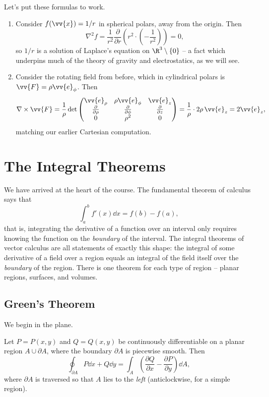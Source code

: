 \begin{example}
	Let's put these formulas to work.
	\begin{enumerate}[label=(\roman*)]
		\item Consider $f(\vv{x}) = 1/r$ in spherical polars, away from the origin. Then
		$$
		\nabla^2 f = \frac{1}{r^2}\frac{\partial}{\partial r}\left(r^2 \cdot \left(-\frac{1}{r^2}\right)\right) = 0,
		$$
		so $1/r$ is a solution of Laplace's equation on $\R^3 \setminus \{0\}$ -- a fact which underpins much of the theory of gravity and electrostatics, as we will see.
		\item Consider the rotating field from before, which in cylindrical polars is $\vv{F} = \rho \vv{e}_\phi$. Then
		$$
		\nabla \times \vv{F} = \frac{1}{\rho}\det\begin{pmatrix}
			\vv{e}_\rho & \rho \vv{e}_\phi & \vv{e}_z \\
			\frac{\partial}{\partial \rho} & \frac{\partial}{\partial \phi} & \frac{\partial}{\partial z} \\
			0 & \rho^2 & 0
		\end{pmatrix} = \frac{1}{\rho} \cdot 2\rho \, \vv{e}_z = 2 \vv{e}_z,
		$$
		matching our earlier Cartesian computation.
	\end{enumerate}
\end{example}
\section{The Integral Theorems}

We have arrived at the heart of the course. The fundamental theorem of calculus says that
$$
\int_a^b f'(x) \dd x = f(b) - f(a),
$$
that is, integrating the derivative of a function over an interval only requires knowing the function on the \emph{boundary} of the interval. The integral theorems of vector calculus are all statements of exactly this shape: the integral of some derivative of a field over a region equals an integral of the field itself over the \emph{boundary} of the region. There is one theorem for each type of region -- planar regions, surfaces, and volumes.

\subsection{Green's Theorem}

We begin in the plane.

\begin{theorem}
	Let $P = P(x, y)$ and $Q = Q(x, y)$ be continuously differentiable on a planar region $A \cup \partial A$, where the boundary $\partial A$ is piecewise smooth. Then
	$$
	\oint_{\partial A} P \dd x + Q \dd y = \int_A \left(\frac{\partial Q}{\partial x} - \frac{\partial P}{\partial y}\right) \dd A,
	$$
	where $\partial A$ is traversed so that $A$ lies to the \emph{left} (anticlockwise, for a simple region).
\end{theorem}

